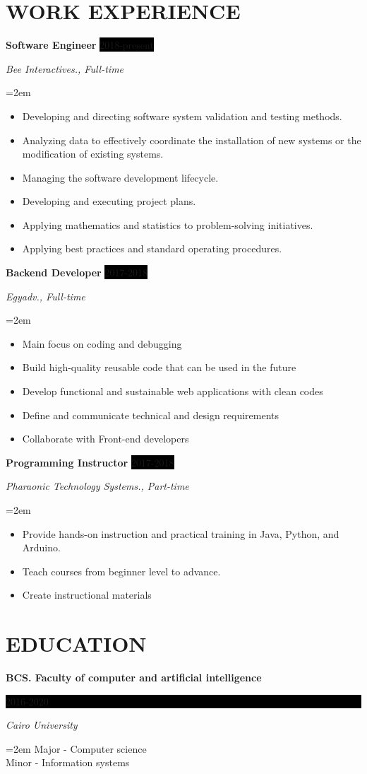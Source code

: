 \documentclass[paper=a4,fontsize=11pt]{scrartcl} %
\newcommand{\sepspace}{\vspace*{1em}}		%
\newcommand{\NewPart}[1]{\section*{\uppercase{#1}}}
\newcommand{\EducationEntry}[4]{
		\noindent \textbf{#1} \hfill      %
		\colorbox{Black}{%
			\parbox{6em}{%
			\hfill\color{White}#2}} \par  %
		\noindent \textit{#3} \par        %
		\noindent\hangindent=2em\hangafter=0 \small #4 %
		\normalsize \par}
\newcommand{\WorkEntry}[4]{				  %
		\noindent \textbf{#1} \hfill      %
		\colorbox{Black}{\color{White}#2} \par  %
		\noindent \textit{#3} \par              %
		\noindent\hangindent=2em\hangafter=0 \small #4 %
		\normalsize \par
		\sepspace}
\begin{document}
\NewPart{Work experience}{

\WorkEntry{Software Engineer}{2018-present}{Bee Interactives., Full-time}{
\begin{itemize}
\item Developing and directing software system validation and testing methods.
\item Analyzing data to effectively coordinate the installation of new systems or the modification of existing systems.
\item Managing the software development lifecycle.
\item Developing and executing project plans.
\item Applying mathematics and statistics to problem-solving initiatives.
\item Applying best practices and standard operating procedures.
\end{itemize}
}


\WorkEntry{Backend Developer}{2017-2018}{Egyadv., Full-time}{
\begin{itemize}
\item Main focus on coding and debugging
\item Build high-quality reusable code that can be used in the future
\item Develop functional and sustainable web applications with clean codes
\item Define and communicate technical and design requirements
\item Collaborate with Front-end developers 
\end{itemize}
}


\WorkEntry{Programming Instructor}{2017-2018}{Pharaonic Technology Systems., Part-time}{
\begin{itemize}
\item Provide hands-on instruction and practical training in Java, Python, and Arduino.
\item Teach courses from beginner level to advance.
\item Create instructional materials
\end{itemize}
}

}

\NewPart{Education}{}

\EducationEntry{BCS. Faculty of computer and artificial intelligence}{2016-2020}{Cairo
  University}{Major - Computer science \\ Minor - Information systems}
\sepspace
\end{document}
